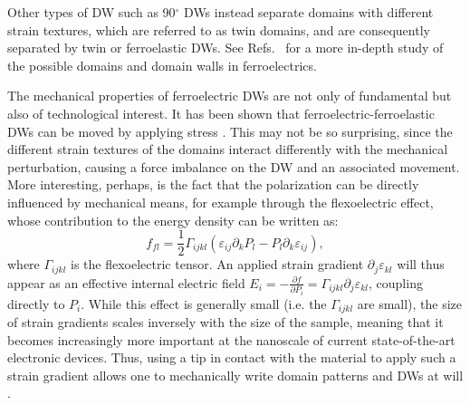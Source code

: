 Other types of \gls{DW} such as 90$^\circ$ \glspl{DW} instead separate domains with different strain textures, which are referred to as twin domains, and are consequently separated by twin or ferroelastic \glspl{DW}.
See Refs.~\cite{Cao1991,Hu1998,Marton2010} for a more in-depth study of the possible domains and domain walls in ferroelectrics.

The mechanical properties of ferroelectric \glspl{DW} are not only of fundamental but also of technological interest.
It has been shown that ferroelectric-ferroelastic \glspl{DW} can be moved by applying stress \cite{Schneider2001}.
This may not be so surprising, since the different strain textures of the domains interact differently with the mechanical perturbation, causing a force imbalance on the \gls{DW} and an associated movement.
More interesting, perhaps, is the fact that the polarization can be directly influenced by mechanical means, for example through the flexoelectric effect, whose contribution to the energy density can be written as:
\begin{equation}
	\label{eq:BTO_flexoelectricity}
	f_{fl} = \frac{1}{2}\Gamma_{ijkl}(\varepsilon_{ij}\partial_kP_l-P_l\partial_k\varepsilon_{ij}),
\end{equation}
where $\Gamma_{ijkl}$ is the flexoelectric tensor.
An applied strain gradient $\partial_j\varepsilon_{kl}$ will thus appear as an effective internal electric field $E_{i} = -\frac{\partial f}{\partial P_i} = \Gamma_{ijkl}\partial_j\varepsilon_{kl}$, coupling directly to $P_i$.
While this effect is generally small (i.e. the $\Gamma_{ijkl}$ are small), the size of strain gradients scales inversely with the size of the sample, meaning that it becomes increasingly more important at the nanoscale of current state-of-the-art electronic devices.
Thus, using a tip in contact with the material to apply such a strain gradient allows one to mechanically write domain patterns and \glspl{DW} at will \cite{Lu2012,Abdollahi2015, Cordero-Edwards2017,Cordero-Edwards2019}.


